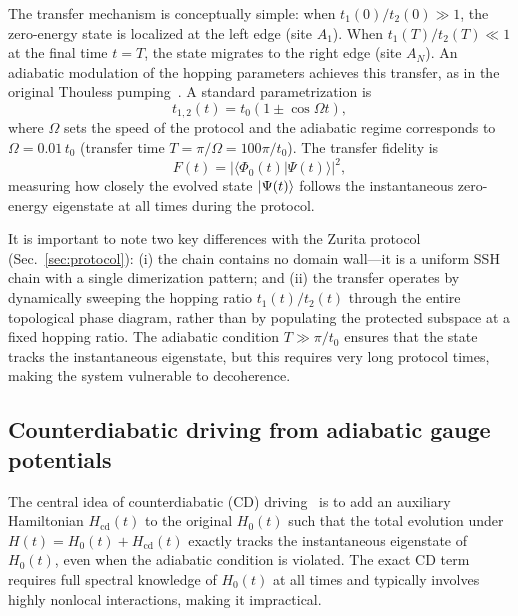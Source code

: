 \documentclass[
  reprint,
  amsmath,
  amssymb,
  aps,
  prb,
  longbibliography,
]{revtex4-2}
\begin{document}
The transfer mechanism is conceptually simple: when $t_1(0)/t_2(0) \gg 1$, the
zero-energy state is localized at the left edge (site $A_1$). When
$t_1(T)/t_2(T) \ll 1$ at the final time $t = T$, the state migrates to the
right edge (site $A_N$). An adiabatic modulation of the hopping parameters
achieves this transfer, as in the original Thouless
pumping~\cite{Thouless1983, Longhi2019}. A standard parametrization
is~\cite{Romero2024}
\begin{equation}
  t_{1,2}(t) = t_0(1 \pm \cos\Omega t),
  \label{eq:hoppings_romero}
\end{equation}
where $\Omega$ sets the speed of the protocol and the adiabatic regime
corresponds to $\Omega = 0.01\,t_0$ (transfer time $T = \pi/\Omega =
100\pi/t_0$). The transfer fidelity is
\begin{equation}
  F(t) = |\langle \Phi_0(t) | \Psi(t) \rangle|^2,
  \label{eq:fidelity_romero}
\end{equation}
measuring how closely the evolved state $\ket{\Psi(t)}$ follows the
instantaneous zero-energy eigenstate at all times during the protocol.

It is important to note two key differences with the Zurita
protocol (Sec.~\ref{sec:protocol}): (i) the chain contains no domain
wall---it is a uniform SSH chain with a single dimerization pattern; and
(ii) the transfer operates by dynamically sweeping the hopping ratio
$t_1(t)/t_2(t)$ through the entire topological phase diagram, rather than
by populating the protected subspace at a fixed hopping ratio. The adiabatic
condition $T \gg \pi/t_0$ ensures that the state tracks the instantaneous
eigenstate, but this requires very long protocol times, making the system
vulnerable to decoherence.

\subsection{Counterdiabatic driving from adiabatic gauge potentials}
\label{sec:cd_driving}

The central idea of counterdiabatic (CD) driving~\cite{Demirplak2003,
Berry2009} is to add an auxiliary Hamiltonian $H_{\mathrm{cd}}(t)$ to the
original $H_0(t)$ such that the total evolution under
$H(t) = H_0(t) + H_{\mathrm{cd}}(t)$ exactly tracks the instantaneous
eigenstate of $H_0(t)$, even when the adiabatic condition is violated. The
exact CD term~\cite{Berry2009} requires full spectral knowledge of $H_0(t)$
at all times and typically involves highly nonlocal interactions, making it
impractical.
\end{document}
